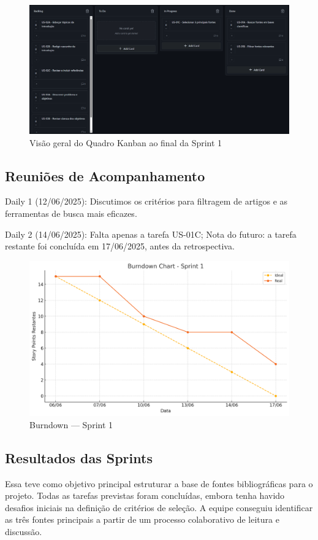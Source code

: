 \begin{figure}[htbp]
  \centering
  \includegraphics[width=0.8\linewidth]{pictures/kanban_sprint1_final.png}
  \caption{Visão geral do Quadro Kanban ao final da Sprint 1}
\end{figure}

\subsection{Reuniões de Acompanhamento}

Daily 1 (12/06/2025): Discutimos os critérios para filtragem de artigos e as ferramentas de busca mais eficazes.

Daily 2 (14/06/2025): Falta apenas a tarefa US-01C; Nota do futuro: a tarefa restante foi concluída em 17/06/2025, antes da retrospectiva.

\begin{figure}[htbp]
  \centering
  \includegraphics[width=0.7\linewidth]{pictures/burndown_sprint1.png}
  \caption{Burndown — Sprint 1}
\end{figure}


\subsection{Resultados das Sprints}

Essa teve como objetivo principal estruturar a base de fontes bibliográficas para o projeto. Todas as tarefas previstas foram concluídas, embora tenha havido desafios iniciais na definição de critérios de seleção. A equipe conseguiu identificar as três fontes principais a partir de um processo colaborativo de leitura e discussão.

